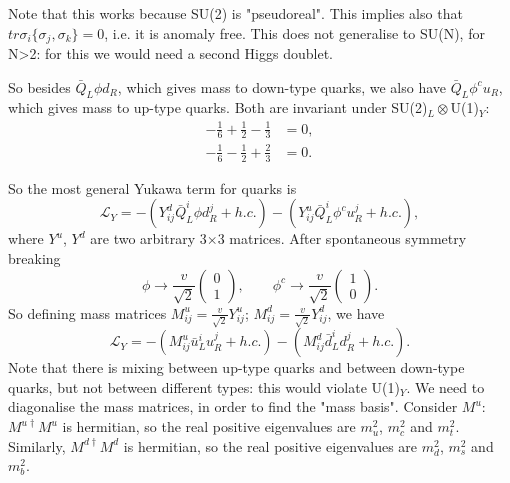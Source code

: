 Note that this works because SU(2) is "pseudoreal". This implies also that $tr \sigma_i \{\sigma_j, \sigma_k \} = 0$, i.e. it is anomaly free. This does not generalise to SU(N), for N>2: for this we would need a second Higgs doublet. 

So besides $\bar{Q}_L\phi d_R$, which gives mass to down-type quarks, we also have $\bar{Q}_L\phi^c u_R$, which gives mass to up-type quarks. Both are invariant under SU(2)$_L \otimes$U(1)$_Y$:
\begin{equation}
\begin{split}
-\frac{1}{6} + \frac{1}{2} - \frac{1}{3} &= 0, \\
-\frac{1}{6} - \frac{1}{2} + \frac{2}{3} &= 0.
\end{split}
\end{equation}

So the most general Yukawa term for quarks is
\begin{equation}
\mathcal{L}_{Y} = -(Y_{ij}^d \bar{Q}_L^i \phi d_R^j + h.c.) - (Y_{ij}^u \bar{Q}_L^i \phi^c u_R^j + h.c.),
\end{equation}
where $Y^u$, $Y^d$ are two arbitrary 3$\times$3 matrices. After spontaneous symmetry breaking
\begin{equation}
\phi \to \frac{v}{\sqrt{2}}\begin{pmatrix} 0 \\ 1 \end{pmatrix},
\qquad \phi^c \to \frac{v}{\sqrt{2}}\begin{pmatrix} 1 \\ 0 \end{pmatrix}.
\end{equation}
So defining mass matrices $M_{ij}^u = \frac{v}{\sqrt{2}}Y_{ij}^u$; $M_{ij}^d = \frac{v}{\sqrt{2}}Y_{ij}^d$, we have
\begin{equation}
\mathcal{L}_{Y} = -(M_{ij}^u \bar{u}_L^i u_R^j + h.c.) - (M_{ij}^d \bar{d}_L^i d_R^j + h.c.).
\end{equation}
Note that there is mixing between up-type quarks and between down-type quarks, but not between different types: this would violate U(1)$_Y$. We need to diagonalise the mass matrices, in order to find the "mass basis". Consider $M^u$: $M^{u \dagger} M^u$ is hermitian, so the real positive eigenvalues are $m_u^2$, $m_c^2$ and $m_t^2$. Similarly, $M^{d \dagger} M^d$ is hermitian, so the real positive eigenvalues are $m_d^2$, $m_s^2$ and $m_b^2$.
